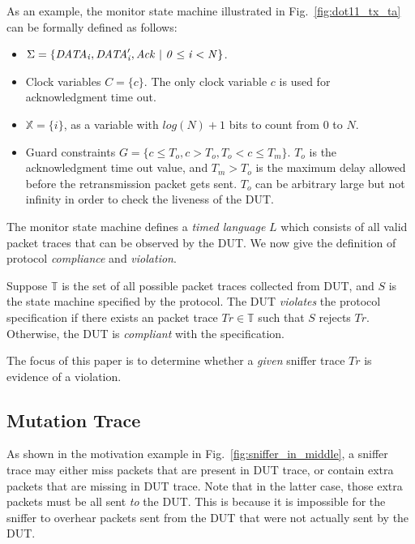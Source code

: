 As an example, the monitor state machine illustrated in
Fig.~\ref{fig:dot11_tx_ta} can be formally defined as follows:

\begin{itemize}
  \item $\Sigma = \{\it{DATA}_i, \it{DATA}'_i, Ack\ |\ 0 \le i < N\}$.
  \item Clock variables $C = \{c\}$. The only clock variable $c$ is
    used for acknowledgment time out.
  \item $\mathbb{X} = \{i\}$, as a variable with ${\mathit log}(N) + 1$ bits to
    count from $0$ to $N$.  
  \item Guard constraints $G = \{ c \le T_o, c > T_o, T_o < c \le T_m\}$.
    $T_o$ is the acknowledgment time out value, and $T_m >
    T_o$ is the maximum delay allowed before the retransmission packet gets
    sent. $T_o$ can be arbitrary large but not infinity in order to check the
    liveness of the DUT.
\end{itemize}


The monitor state machine defines a \textit{timed language} $L$ which consists
of all valid packet traces that can be observed by the DUT.  We now give the
definition of protocol \textit{compliance} and \textit{violation}.

\begin{definition}
  Suppose $\mathbb{T}$ is the set of all possible packet traces collected from
  DUT, and $S$ is the state machine specified by the protocol. The DUT
  \textit{violates} the protocol specification if there exists an
  packet trace $Tr \in \mathbb{T}$ such that $S$ rejects $Tr$.
  Otherwise, the DUT is \textit{compliant} with the specification.
\end{definition}

The focus of this paper is to determine whether a \textit{given} sniffer trace
$Tr$ is evidence of a violation.
%


\subsection{Mutation Trace}
\label{subsec:mutation}

As shown in the motivation example in Fig.~\ref{fig:sniffer_in_middle}, a
sniffer trace may either miss packets that are present in DUT trace, or contain
extra packets that are missing in DUT trace. Note that in the latter case, those
extra packets must be all sent \textit{to} the DUT. This is because it is
impossible for the sniffer to overhear packets sent from the DUT that were not
actually sent by the DUT.

